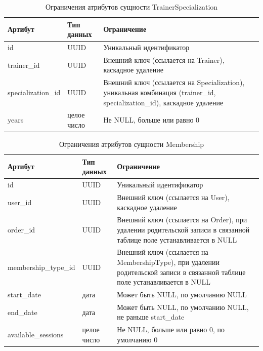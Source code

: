 \begin{table}[H]
	\centering
	\begin{tabular}{|p{3.5cm}|p{3.5cm}|p{8.5cm}|}
		\hline
		\textbf{Артибут}             & \textbf{Тип данных}   & \textbf{Ограничение}             \\ \hline
		id                            & UUID                  & Уникальный идентификатор         \\ \hline
		trainer\_id                   & UUID                & Внешний ключ (ссылается на Trainer), каскадное удаление \\ \hline
		specialization\_id            & UUID                 & Внешний ключ (ссылается на Specialization), уникальная комбинация (trainer\_id, specialization\_id), каскадное удаление \\ \hline
		years                         & целое число                   & Не NULL, больше или равно 0      \\ \hline
	\end{tabular}
	\caption{Ограничения атрибутов сущности TrainerSpecialization}
\end{table}

\begin{table}[H]
	\centering
	\begin{tabular}{|p{4.5cm}|p{3.5cm}|p{7.5cm}|}
		\hline
		\textbf{Артибут}             & \textbf{Тип данных}   & \textbf{Ограничение}             \\ \hline
		id                            & UUID                  & Уникальный идентификатор         \\ \hline
		user\_id                      & UUID                  & Внешний ключ (ссылается на User), каскадное удаление \\ \hline
		order\_id                     & UUID                  & Внешний ключ (ссылается на Order),  при удалении родительской записи в связанной таблице поле устанавливается в NULL\\ \hline
		membership\_type\_id          & UUID                  & Внешний ключ (ссылается на MembershipType),  при удалении родительской записи в связанной таблице поле устанавливается в NULL \\ \hline
		start\_date                   & дата                  & Может быть NULL, по умолчанию NULL \\ \hline
		end\_date                     & дата                  & Может быть NULL, по умолчанию NULL, не раньше start\_date \\ \hline
		available\_sessions           & целое число               & Не NULL, больше или равно 0, по умолчанию 0 \\ \hline
	\end{tabular}
	\caption{Ограничения атрибутов сущности Membership}
	\label{t:at}
\end{table}

